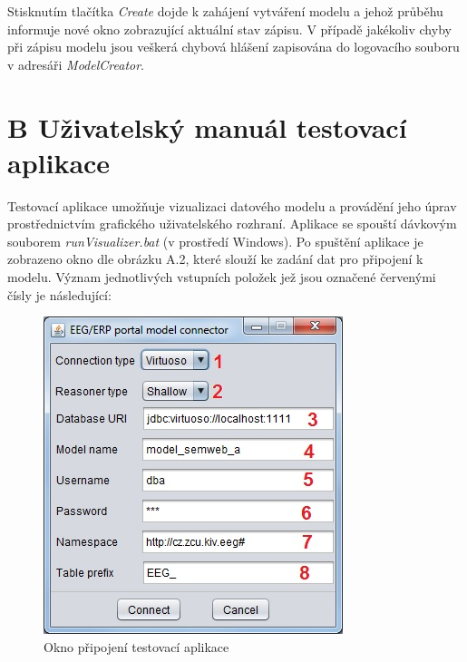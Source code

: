\documentclass{projekt}
\begin{document}
\thispagestyle{plain}

Stisknutím tlačítka {\it Create} dojde k zahájení vytváření modelu a jehož průběhu informuje nové okno zobrazující aktuální stav zápisu. V případě jakékoliv chyby při zápisu modelu jsou veškerá chybová hlášení zapisována do logovacího souboru v adresáři {\it ModelCreator}.


\newpage
\thispagestyle{plain}
\section*{{\LARGE B} Uživatelský manuál testovací aplikace}
\hspace{0.65cm}Testovací aplikace umožňuje vizualizaci datového modelu a provádění jeho úprav prostřednictvím grafického uživatelského rozhraní. Aplikace se spouští dávkovým souborem {\it runVisualizer.bat} (v prostředí Windows). Po spuštění aplikace je zobrazeno okno dle obrázku A.2, které slouží ke zadání dat pro připojení k modelu. Význam jednotlivých vstupních položek jež jsou označené červenými čísly je následující:


\begin{figure}[htb!]
\begin{center}
\includegraphics[scale=0.8]{manualTestConnect.jpg}
\caption{Okno připojení testovací aplikace}
\end{center}
\end{figure}
\end{document}
